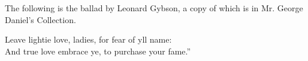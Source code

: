 The following is the ballad by Leonard Gybson, a copy of which is in Mr.
George Daniel’s Collection.
\pagebreak


\vspace{-\baselineskip}

\settowidth{\versewidth}{Leave lightie love, ladies, for fear ofyll name:}
\begin{scverse}Leave lightie love, ladies, for fear of yll name:\\
And true love embrace ye, to purchase your fame.”
\end{scverse}



\smallskip


\vspace{-1.5\baselineskip}

